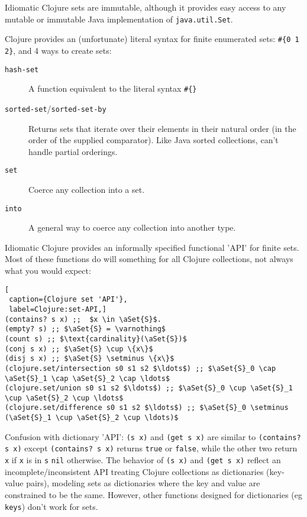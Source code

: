 Idiomatic Clojure sets are immutable, although it provides easy
access to any mutable or immutable Java implementation of
\lstinline|java.util.Set|.

Clojure provides an (unfortunate) literal syntax for finite
enumerated sets: 
\lstinline|#{0 1 2}|, and 4 ways to create sets:
\begin{description}
\item[\texttt{hash-set}] A function equivalent to the
literal syntax \lstinline|#{}|
\item[\texttt{sorted-set}/\texttt{sorted-set-by}] Returns
sets that iterate over their elements in their natural order (in the
order of the supplied comparator). Like Java sorted collections,
can't handle partial orderings.
\item[\texttt{set}] Coerce any collection into a set.
\item[\texttt{into}] A general way to coerce any collection
into another type.
\end{description}

Idiomatic Clojure provides an informally specified functional
'API' for finite sets. Most of these functions do will something
for all Clojure collections, not always what you would expect:
\begin{lstlisting}[
 caption={Clojure set 'API'}, 
 label=Clojure:set-API,]
(contains? s x) ;;  $x \in \aSet{S}$.
(empty? s) ;; $\aSet{S} = \varnothing$
(count s) ;; $\text{cardinality}(\aSet{S})$
(conj s x) ;; $\aSet{S} \cup \{x\}$
(disj s x) ;; $\aSet{S} \setminus \{x\}$
(clojure.set/intersection s0 s1 s2 $\ldots$) ;; $\aSet{S}_0 \cap \aSet{S}_1 \cap \aSet{S}_2 \cap \ldots$ 
(clojure.set/union s0 s1 s2 $\ldots$) ;; $\aSet{S}_0 \cup \aSet{S}_1 \cup \aSet{S}_2 \cup \ldots$ 
(clojure.set/difference s0 s1 s2 $\ldots$) ;; $\aSet{S}_0 \setminus (\aSet{S}_1 \cup \aSet{S}_2 \cup \ldots)$
\end{lstlisting}

Confusion with dictionary 'API':
 \lstinline|(s x)| and \lstinline|(get s x)| are similar to
 \lstinline|(contains? s x)| except \lstinline|(contains? s x)| returns
 \lstinline|true| or \lstinline|false|, while the other two return
 \lstinline|x| if \lstinline|x| is in \lstinline|s| \lstinline|nil| otherwise.
The behavior of \lstinline|(s x)| and \lstinline|(get s x)| reflect an
incomplete/inconsistent API treating Clojure collections as
dictionaries (key-value pairs), modeling sets as dictionaries
where the key and value are constrained to be the same.
However, other functions designed for dictionaries (eg
\lstinline|keys|) don't work for sets.
 
